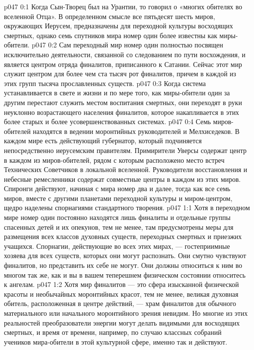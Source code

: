\author{Блестящая Вечерняя Звезда}
\vs p047 0:1 Когда Сын\hyp{}Творец был на Урантии, то говорил о «многих обителях во вселенной Отца». В определенном смысле все пятьдесят шесть миров, окружающих Иерусем, предназначены для переходной культуры восходящих смертных, однако семь спутников мира номер один более известны как миры\hyp{}обители.
\vs p047 0:2 Сам переходный мир номер один полностью посвящен исключительно деятельности, связанной со следованием по пути восхождения, и является центром отряда финалитов, приписанного к Сатании. Сейчас этот мир служит центром для более чем ста тысяч рот финалитов, причем в каждой из этих групп тысяча прославленных существ.
\vs p047 0:3 Когда система устанавливается в свете и жизни и по мере того, как миры\hyp{}обители один за другим перестают служить местом воспитания смертных, они переходят в руки неуклонно возрастающего населения финалитов, которое накапливается в этих более старых и более усовершенствованных системах.
\vs p047 0:4 Семь миров\hyp{}обителей находятся в ведении моронтийных руководителей и Мелхиседеков. В каждом мире есть действующий губернатор, который подчиняется непосредственно иерусемским правителям. Примирители Уверсы содержат центр в каждом из миров\hyp{}обителей, рядом с которым расположено место встреч Технических Советчиков в локальной вселенной. Руководители восстановления и небесные ремесленники содержат совместные центры в каждом из этих миров. Спиронги действуют, начиная с мира номер два и далее, тогда как все семь миров, вместе с другими планетами переходной культуры и миром\hyp{}центром, щедро наделены спорнагиями стандартного творения.
\vs p047 1:1 Хотя в переходном мире номер один постоянно находятся лишь финалиты и отдельные группы спасенных детей и их опекунов, тем не менее, там предусмотрены меры для размещения всех классов духовных существ, переходных смертных и приезжих учащихся. Спорнагии, действующие во всех этих мирах, --- гостеприимные хозяева для всех существ, которых они могут распознать. Они смутно чувствуют финалитов, но представить их себе не могут. Они должны относиться к ним во многом так же, как и вы в вашем теперешнем физическом состоянии относитесь к ангелам.
\vs p047 1:2 Хотя мир финалитов --- это сфера изысканной физической красоты и необычайных моронтийных красот, тем не менее, великая духовная обитель, расположенная в центре действий, --- храм финалитов для обычного материального или начального моронтийного зрения невидим. Но многие из этих реальностей преобразователи энергии могут делать видимыми для восходящих смертных, и время от времени, например, по случаю классных собраний учеников мира\hyp{}обители в этой культурной сфере, именно так и действуют.
